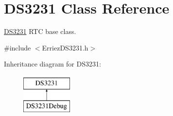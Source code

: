 \hypertarget{class_d_s3231}{}\section{D\+S3231 Class Reference}
\label{class_d_s3231}


\hyperlink{class_d_s3231}{D\+S3231} R\+TC base class.  




{\ttfamily \#include $<$Erriez\+D\+S3231.\+h$>$}

Inheritance diagram for D\+S3231\+:\begin{figure}[H]
\begin{center}
\leavevmode
\includegraphics[height=2.000000cm]{class_d_s3231}
\end{center}
\end{figure}

